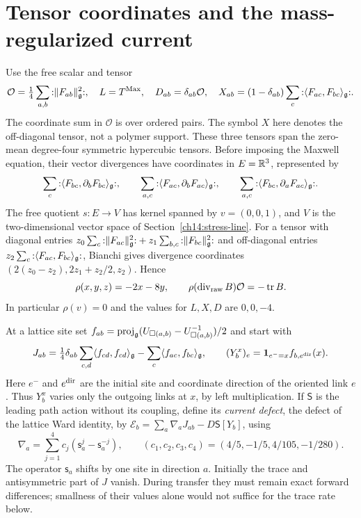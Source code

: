 



\section{Tensor coordinates and the mass-regularized current}
\label{ch17:current}

Use the free scalar and tensor
\[
 \mathcal O=\tfrac14\sum_{a,b}{:}\|F_{ab}\|_{\mathfrak g}^2{:},
 \quad L=T^{\rm Max},\quad D_{ab}=\delta_{ab}\mathcal O,
 \quad X_{ab}=(1-\delta_{ab})\sum_c{:}\langle F_{ac},F_{bc}\rangle_{\mathfrak g}{:}.
\]
The coordinate sum in $\mathcal O$ is over ordered pairs. The symbol
$X$ here denotes the off-diagonal tensor, not a polymer support.
These three tensors span the zero-mean degree-four symmetric
hypercubic tensors. Before imposing the Maxwell equation, their
vector divergences have coordinates in $E=\mathbb R^3$, represented by
\[
 \sum_c {:}\langle F_{bc},\partial_bF_{bc}\rangle_{\mathfrak g}{:},\qquad
 \sum_{a,c}{:}\langle F_{ac},\partial_bF_{ac}\rangle_{\mathfrak g}{:},\qquad
 \sum_{a,c}{:}\langle F_{bc},\partial_aF_{ac}\rangle_{\mathfrak g}{:}.
\]
The free
quotient $s:E\to V$ has kernel spanned by $v=(0,0,1)$, and $V$
is the two-dimensional vector space of Section~\ref{ch14:stress-line}.
For a tensor with diagonal entries
$z_0\sum_c{:}\|F_{ac}\|_{\mathfrak g}^2{:}+z_1\sum_{b,c}{:}\|F_{bc}\|_{\mathfrak g}^2{:}$ and off-diagonal entries
$z_2\sum_c{:}\langle F_{ac},F_{bc}\rangle_{\mathfrak g}{:}$, Bianchi gives divergence coordinates
$(2(z_0-z_2),2z_1+z_2/2,z_2)$. Hence
\begin{equation}
 \rho(x,y,z)=-2x-8y,\qquad
 \rho(\operatorname{div}_{\rm raw}B)\mathcal O=-\operatorname{tr}B.
 \label{ch17:rho}
\end{equation}
In particular $\rho(v)=0$ and the values for $L,X,D$ are $0,0,-4$.

At a lattice site set
$f_{ab}=\operatorname{proj}_{\mathfrak g}(U_{\square(a,b)}-
U_{\square(a,b)}^{-1})/2$ and start with
\[
 J_{ab}=\tfrac14\delta_{ab}\sum_{c,d}\langle f_{cd},f_{cd}\rangle_{\mathfrak g}
                  -\sum_c\langle f_{ac},f_{bc}\rangle_{\mathfrak g},
 \qquad (Y_b^x)_e=\mathbf1_{e^-=x}f_{b,e^{\rm dir}}(x).
\]
Here $e^-$ and $e^{\rm dir}$ are the initial site and coordinate
direction of the oriented link $e$. Thus $Y_b^x$ varies only the
outgoing links at $x$, by left multiplication. If $\mathsf S$ is the leading
path action without its coupling, define its \emph{current defect}, the defect of the lattice Ward identity, by
$\mathcal E_b=\sum_a\nabla_aJ_{ab}-D\mathsf S[Y_b]$, using
\[
 \nabla_a=\sum_{j=1}^4c_j(\mathsf s_a^j-\mathsf s_a^{-j}),
 \qquad(c_1,c_2,c_3,c_4)=(4/5,-1/5,4/105,-1/280).
\]
The operator $\mathsf s_a$ shifts by one site in direction $a$.
Initially the trace and antisymmetric part of $J$ vanish. During
transfer they must remain exact forward differences; smallness of their
values alone would not suffice for the trace rate below.

